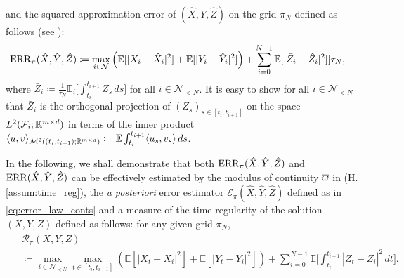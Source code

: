 \documentclass[11pt]{article}
\numberwithin{equation}{section}
\theoremstyle{definition}
\theoremstyle{remark}
\def\ol{\overline} \def\cl{\centerline}   \def\ul{\underline}
\def\l{\label}  \def\f{\frac}  \def\fa{\forall}
\def \la{\langle} \def\ra{\rangle}
\def\cE{\mathcal{E}}
\def\cF{\mathcal{F}}
\def\cM{\mathcal{M}}
\def\cN{\mathcal{N}}
\def\cR{\mathcal{R}}
\def\sE{{\mathbb{E}}}
\def\sR{{\mathbb R}}
\newcommand{\err}{\textnormal{ERR}}
\begin{document}
and  
 the squared approximation error
of $(\hat{X},\hat{Y},\hat{Z})$
on the grid $\pi_N$  defined as follows (see \cite{zhang2004,lionnet2015}):
\begin{align}\l{eq:error_T_N}
\begin{split}
\err_\pi(\hat{X},\hat{Y},\hat{Z})
&\coloneqq \max_{i\in \cN}
\left(
\sE[|
X_i
-\hat{X}_{i}|^2]
+
\sE[|
{Y}_i
-\hat{Y}_{i}|^2]
\right)
+
\sum_{i=0}^{N-1}
\sE[
|\bar{Z}_{i}
-\hat{Z}_{i}|^2
]
]\tau_N,
\end{split}
\end{align}
 where 
$\bar{Z}_i\coloneqq \frac{1}{\tau_N}\sE_i\big[\int_{t_i}^{t_{i+1}} Z_s\, ds\big]$ for all $i\in \cN_{<N}$.
%
%
It is easy to show 
for all $i\in \cN_{<N}$ that
 $\bar{Z}_i$ is the orthogonal projection of $(Z_s)_{s\in [t_i,t_{i+1}]}$ on the space $L^2(\cF_{i};\sR^{m\t d})$ in terms of  the inner product $\la u,v \ra_{\cM^2((t_i,t_{i+1});\sR^{m\t d})} \coloneqq \sE \int_{t_i}^{t_{i+1}} \la u_s, v_s\ra \,ds$.




In the following,
we shall demonstrate that 
both $\err_\pi(\hat{X},\hat{Y},\hat{Z})$ and
$\err(\hat{X},\hat{Y},\hat{Z})$ can be effectively estimated  by the modulus of continuity $\ol{\om}$ in (H.\ref{assum:time_reg}), 
the \textit{a posteriori} error estimator 
$\cE_\pi(\hat{X},\hat{Y},\hat{Z})$ defined as in \eqref{eq:error_law_conts}
and 
a measure of 
the time regularity of the solution $(X,Y,Z)$ defined 
 as follows: for any given grid $\pi_N$,
\begin{align}\l{eq:L2_Regularity_proj}
\begin{split}
&\cR_\pi({X},{Y},{Z})
\\
&\coloneqq 
\max_{i\in \cN_{<N}}
\max_{t\in [t_i,t_{i+1}]}
\left(
\sE[|X_t
-{X}_{i}|^2
]
+
\sE[|
{Y}_t
-{Y}_{i}|^2]
\right)
+
\sum_{i=0}^{N-1}
\sE\bigg[
\int_{t_i}^{t_{i+1}}
|{Z}_{t}
-\bar{Z}_{i}|^2
\,dt
\bigg].
\end{split}
\end{align}
\end{document}
